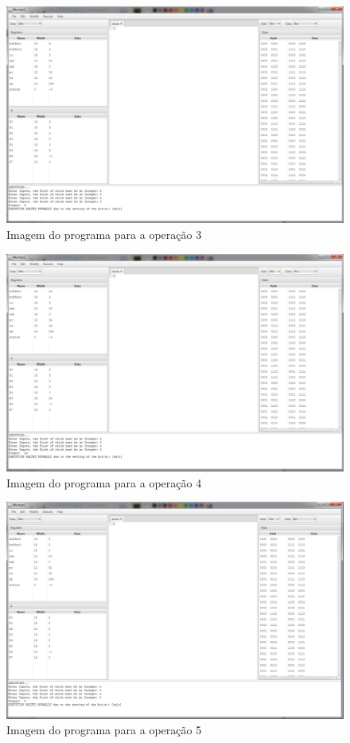\documentclass{article}
\begin{document}
\begin{figure}[h!]
\centering
\includegraphics[scale=0.34]{3.png}
\caption{Imagem do programa para a operação 3}
\label{fig:ibagem3}
\end{figure}


\begin{figure}[h!]
\centering
\includegraphics[scale=0.34]{4.png}
\caption{Imagem do programa para a operação 4}
\label{fig:ibagem4}
\end{figure}

\begin{figure}[h!]
\centering
\includegraphics[scale=0.34]{5.png}
\caption{Imagem do programa para a operação 5}
\label{fig:ibagem5}
\end{figure}
\end{document}
